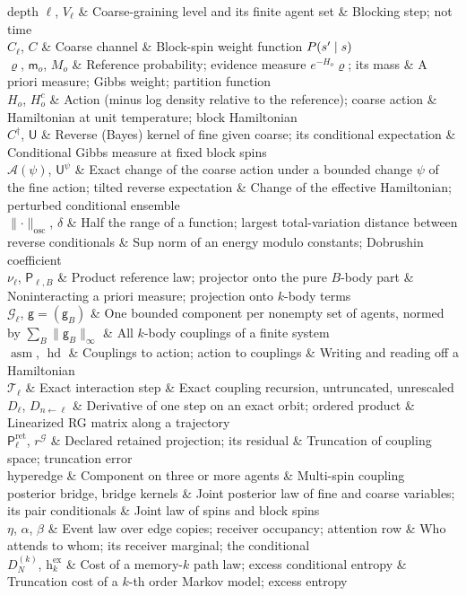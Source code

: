 \begin{decoder}
depth $\ell$, $V_\ell$ & Coarse-graining level and its finite agent set & Blocking step; not time\\
$C_\ell$, $C$ & Coarse channel & Block-spin weight function $P(s'\mid s)$\\
$\varrho$, $\mathsf m_o$, $M_o$ & Reference probability; evidence measure $e^{-H_o}\varrho$; its mass
& A priori measure; Gibbs weight; partition function\\
$H_o$, $H^c_o$ & Action (minus log density relative to the reference); coarse action & Hamiltonian
at unit temperature; block Hamiltonian\\
$C^\dagger$, $\mathsf U$ & Reverse (Bayes) kernel of fine given coarse; its conditional expectation &
Conditional Gibbs measure at fixed block spins\\
$\mathcal A(\psi)$, $\mathsf U^\psi$ & Exact change of the coarse action under a bounded change $\psi$
of the fine action; tilted reverse expectation & Change of the effective Hamiltonian; perturbed
conditional ensemble\\
$\lVert\cdot\rVert_{\mathrm{osc}}$, $\delta$ & Half the range of a function; largest total-variation
distance between reverse conditionals & Sup norm of an energy modulo constants; Dobrushin
coefficient\\
$\nu_\ell$, $\mathsf P_{\ell,B}$ & Product reference law; projector onto the pure $B$-body part &
Noninteracting a priori measure; projection onto $k$-body terms\\
$\mathcal G_\ell$, $\mathsf g=(\mathsf g_B)$ & One bounded component per nonempty set of agents,
normed by $\sum_B\lVert\mathsf g_B\rVert_\infty$ & All $k$-body couplings of a finite system\\
$\operatorname{asm}$, $\operatorname{hd}$ & Couplings to action; action to couplings & Writing and
reading off a Hamiltonian\\
$\mathcal T_\ell$ & Exact interaction step & Exact coupling recursion, untruncated, unrescaled\\
$D_\ell$, $D_{n\leftarrow\ell}$ & Derivative of one step on an exact orbit; ordered product &
Linearized RG matrix along a trajectory\\
$\mathsf P^{\mathrm{ret}}_\ell$, $r^{\mathcal G}$ & Declared retained projection; its residual &
Truncation of coupling space; truncation error\\
hyperedge & Component on three or more agents & Multi-spin coupling\\
posterior bridge, bridge kernels & Joint posterior law of fine and coarse variables; its pair
conditionals & Joint law of spins and block spins\\
$\eta$, $\alpha$, $\beta$ & Event law over edge copies; receiver occupancy; attention row & Who
attends to whom; its receiver marginal; the conditional\\
$D^{(k)}_N$, $\mathrm h^{\mathrm{ex}}_k$ & Cost of a memory-$k$ path law; excess conditional entropy
& Truncation cost of a $k$-th order Markov model; excess entropy\\
\end{decoder}

